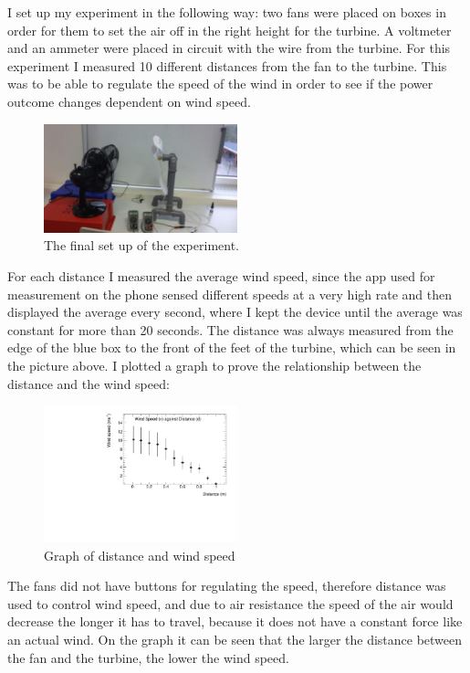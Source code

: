 \documentclass[12pt]{article}
\begin{document}
I set up my experiment in the following way: two fans were placed on boxes in order for them to set the air off in the right height for the turbine.
A voltmeter and an ammeter were placed in circuit with the wire from the turbine.
For this experiment I measured 10 different distances from the fan to the turbine.
This was to be able to regulate the speed of the wind in order to see if the power outcome changes dependent on wind speed.

\begin{figure}[h]
  \centering
  \includegraphics[width=0.5\textwidth]{img/finalsetup.jpg}
  \caption{The final set up of the experiment.}
  \label{figure:FinalSetup}
\end{figure}

For each distance I measured the average wind speed, since the app used for measurement on the phone sensed different speeds at a very high rate and then displayed the average every second, where I kept the device until the average was constant for more than 20 seconds.
The distance was always measured from the edge of the blue box to the front of the feet of the turbine, which can be seen in the picture above.
I plotted a graph to prove the relationship between the distance and the wind speed:

\begin{figure}[h]
\centering
\includegraphics[width=0.5\textwidth]{img/WindSpeedVsDistance.pdf}
\caption{Graph of distance and wind speed}
\label{figure:DistanceVsWindSpeed}
\end{figure}

The fans did not have buttons for regulating the speed, therefore distance was used to control wind speed, and due to air resistance the speed of the air would decrease the longer it has to travel, because it does not have a constant force like an actual wind.
On the graph it can be seen that the larger the distance between the fan and the turbine, the lower the wind speed.
\end{document}
